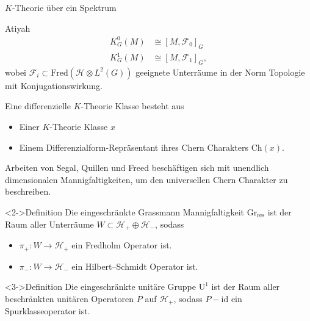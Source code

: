 \documentclass[12pt,utf8,notheorems,compress,t]{beamer}
\renewcommand{\_}{\mathpunct{.}}
\newcommand{\?}{\,{:}\,}
\newcommand{\Ch}{\mathrm{Ch}}
\begin{document}
\begin{frame}{$K$-Theorie über ein Spektrum}
    \begin{exampleblock}{Atiyah}{}
        \vspace{-1em}
        \begin{align*}
            K_G^0(M) &\cong [M, \mathscr{F}_0]_G \\
            K_G^1(M) &\cong [M, \mathscr{F}_1]_G,
        \end{align*}
        wobei $\mathscr{F}_i\subset \mathrm{Fred}(\mathcal{H}\otimes L^2(G))$
        geeignete Unterräume in der Norm Topologie mit Konjugationswirkung.
    \end{exampleblock}
\end{frame}
\begin{frame}
    Eine differenzielle $K$-Theorie Klasse besteht aus
    \begin{itemize}
        \item<2-> Einer $K$-Theorie Klasse $x$
        \item<3-> Einem Differenzialform-Repräsentant ihres Chern Charakters
            $\Ch(x)$.
    \end{itemize}
    
\end{frame}
\begin{frame}
    Arbeiten von Segal, Quillen und Freed beschäftigen sich mit unendlich
    dimensionalen Mannigfaltigkeiten, um den universellen Chern Charakter zu
    beschreiben.
    \begin{block}<2->{Definition}
        Die eingeschränkte Grassmann Mannigfaltigkeit
        $\mathrm{Gr}_{\mathrm{res}}$ ist der Raum aller Unterräume $W\subset
        \mathcal{H}_+ \oplus \mathcal{H}_-$, sodass 
        \begin{itemize}
            \item $\pi_+\colon W\to \mathcal{H}_+$ ein Fredholm Operator ist.
            \item $\pi_-\colon W \to \mathcal{H}_-$ ein Hilbert--Schmidt
                Operator ist.
        \end{itemize}
    \end{block}
    \begin{block}<3->{Definition}
        Die eingeschränkte unitäre Gruppe $\mathrm U^1$ ist der Raum aller
        beschränkten
        unitären Operatoren $P$ auf $\mathcal{H}_+$, sodass $P-\mathrm{id}$ ein
        Spurklasseoperator ist.
    \end{block}
\end{frame}
\end{document}
